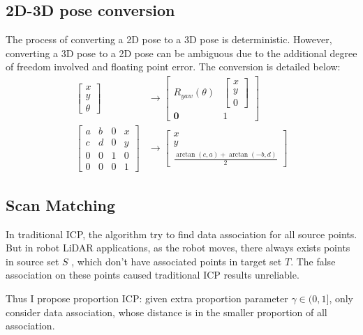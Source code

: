 \documentclass[conference]{IEEEtran}
\begin{document}
\subsection{2D-3D pose conversion}
The process of converting a 2D pose to a 3D pose is deterministic. 
However, converting a 3D pose to a 2D pose can be ambiguous 
due to the additional degree of freedom involved and floating point error. 
The conversion is detailed below:
$$
\begin{aligned}
    \left[ \begin{gathered}x\\ y\\ \theta \end{gathered} \right]  
        &\rightarrow \left[ \begin{matrix}R_{yaw}(\theta )&\left[ \begin{gathered}x\\ y\\ 0\end{gathered} \right]  \\ \mathbf{0}&1\end{matrix} \right] \\
    \left[ \begin{matrix}a&b&0&x\\ c&d&0&y\\ 0&0&1&0\\ 0&0&0&1\end{matrix} \right]  
        &\rightarrow \left[ \begin{gathered}x\\ y\\ \frac{\arctan (c,a)+\arctan (-b,d)}{2} \end{gathered} \right]
\end{aligned} 
$$



\subsection{Scan Matching}
In traditional ICP, the algorithm try to find data association for all source points.
But in robot LiDAR applications, as the robot moves, 
there always exists points in source set $S$ , which don't have associated points in target set $T$.
The false association on these points caused traditional ICP results unreliable.

Thus I propose proportion ICP: given extra proportion parameter $\gamma \in (0,1]$,
only consider data association, whose distance is in the smaller proportion of all association.
\end{document}
